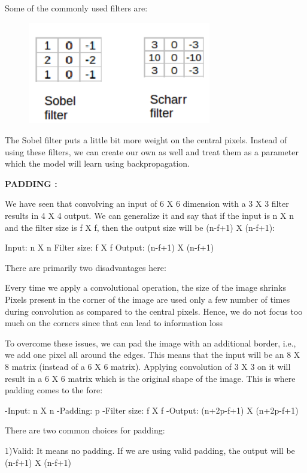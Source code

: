 \documentclass[a4paper]{article}
\begin{document}
Some of the commonly used filters are: 

{
\begin{figure}[htp]
    \centering
    \includegraphics[width=8cm]{filter.png}
\end{figure}
}

The Sobel filter puts a little bit more weight on the central pixels. Instead of using these filters, we can create our own as well and treat them as a parameter which the model will learn using backpropagation. 
\clearpage

\textbf{PADDING :}

We have seen that convolving an input of 6 X 6 dimension with a 3 X 3 filter results in 4 X 4 output. We can generalize it and say that if the input is n X n and the filter size is f X f, then the output size will be (n-f+1) X (n-f+1):

    Input: n X n
    Filter size: f X f
    Output: (n-f+1) X (n-f+1)
    
There are primarily two disadvantages here:

    Every time we apply a convolutional operation, the size of the image shrinks
    Pixels present in the corner of the image are used only a few number of times during convolution as compared to the central pixels. Hence, we do not focus too much on the corners since that can lead to information loss

To overcome these issues, we can pad the image with an additional border, i.e., we add one pixel all around the edges. This means that the input will be an 8 X 8 matrix (instead of a 6 X 6 matrix). Applying convolution of 3 X 3 on it will result in a 6 X 6 matrix which is the original shape of the image. This is where padding comes to the fore: 

   -Input: n X n
    -Padding: p
    -Filter size: f X f
    -Output: (n+2p-f+1) X (n+2p-f+1)

There are two common choices for padding:

    1)Valid: It means no padding. If we are using valid padding, the output will be (n-f+1) X (n-f+1)
    
\end{document}
